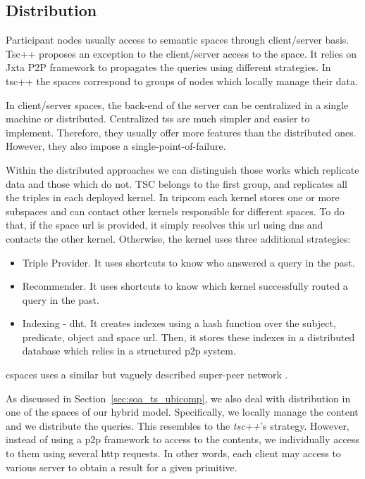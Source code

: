 \subsection{Distribution} %

Participant nodes usually access to semantic spaces through client/server basis.
Tsc++ proposes an exception to the client/server access to the space.
It relies on Jxta P2P framework to propagates the queries using different strategies.
In tsc++ the spaces correspond to groups of nodes which locally manage their data.


In client/server spaces, the back-end of the server can be centralized in a single machine or distributed.
Centralized \aclp{ts} are much simpler and easier to implement.
Therefore, they usually offer more features than the distributed ones.
However, they also impose a single-point-of-failure.


Within the distributed approaches we can distinguish those works which replicate data and those which do not.
TSC belongs to the first group, and replicates all the triples in each deployed kernel.
In \ac{tripcom} each kernel stores one or more subspaces and can contact other kernels responsible for different spaces.
To do that, if the space \ac{url} is provided, it simply resolves this \ac{url} using \ac{dns} and contacts the other kernel.
Otherwise, the kernel uses three additional strategies:
\begin{itemize}
  \item Triple Provider.
	It uses shortcuts to know who answered a query in the past.
  \item Recommender.
	It uses shortcuts to know which kernel successfully routed a query in the past.
  \item Indexing - \ac{dht}.
	It creates indexes using a hash function over the subject, predicate, object and space \ac{url}.
	Then, it stores these indexes in a distributed database which relies in a structured \ac{p2p} system. %
\end{itemize}
\ac{cspaces} uses a similar but vaguely described super-peer network \citep{martinrecuerda_application_2006}.


As discussed in Section~\ref{sec:soa_ts_ubicomp}, we also deal with distribution in one of the spaces of our hybrid model.
Specifically, we locally manage the content and we distribute the queries.
This resembles to the \emph{tsc++}'s strategy.
However, instead of using a \ac{p2p} framework to access to the contents,
we individually access to them using several \ac{http} requests. %
In other words, each client may access to various server to obtain a result for a given primitive.

